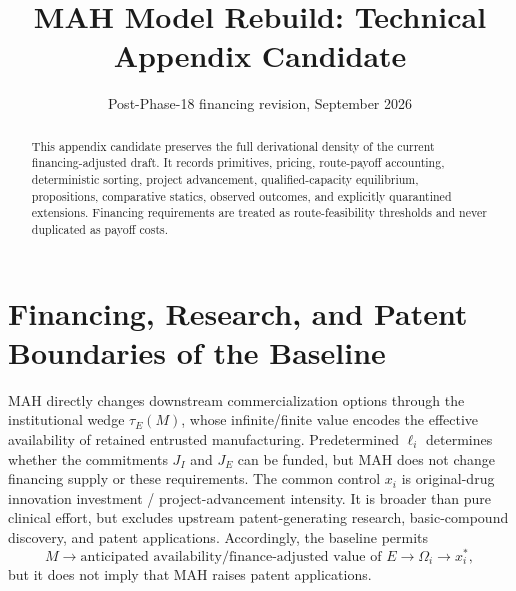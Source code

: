 \documentclass[11pt]{article}
\title{MAH Model Rebuild: Technical Appendix Candidate}
\author{}
\date{Post-Phase-18 financing revision, September 2026}
\begin{document}
\maketitle

\begin{abstract}
This appendix candidate preserves the full derivational density of the
current financing-adjusted draft. It records primitives, pricing, route-payoff
accounting, deterministic sorting, project advancement, qualified-capacity
equilibrium, propositions, comparative statics, observed outcomes, and
explicitly quarantined extensions. Financing requirements are treated as
route-feasibility thresholds and never duplicated as payoff costs.
\end{abstract}

\tableofcontents












\section{Financing, Research, and Patent Boundaries of the Baseline}
\label{sec:p16a-research-development-boundary}

MAH directly changes downstream commercialization options through the
institutional wedge \(\tau_E(M)\), whose infinite/finite value encodes the
effective availability of retained entrusted manufacturing. Predetermined
\(\ell_i\) determines whether the commitments \(J_I\) and \(J_E\) can be
funded, but MAH does not change financing supply or these requirements. The
common control \(x_i\) is original-drug innovation
investment / project-advancement intensity. It is broader than pure clinical
effort, but excludes upstream patent-generating research, basic-compound
discovery, and patent applications. Accordingly, the baseline permits
\[
  M
  \longrightarrow
  \text{anticipated availability/finance-adjusted value of }E
  \longrightarrow
  \Omega_i
  \longrightarrow
  x_i^*,
\]
but it does not imply that MAH raises patent applications.
\end{document}
